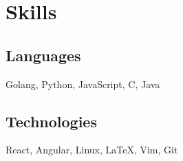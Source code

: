 \documentclass[11pt]{article}
\begin{document}
\section{Skills}
\begin{minipage}{20em}
	\subsection{Languages}
		Golang, Python, JavaScript, C, Java
\end{minipage}
\begin{minipage}{25em}
	\subsection{Technologies}
	React, Angular, Linux, \LaTeX, Vim, Git 	
\end{minipage}
\end{document}
